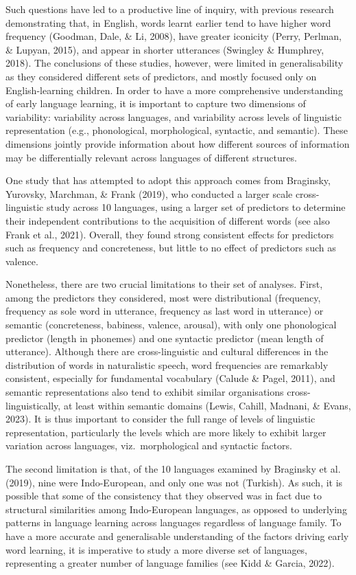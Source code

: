 \documentclass[10pt, letterpaper]{article}
\begin{document}
Such questions have led to a productive line of inquiry, with previous
research demonstrating that, in English, words learnt earlier tend to
have higher word frequency (Goodman, Dale, \& Li, 2008), have greater
iconicity (Perry, Perlman, \& Lupyan, 2015), and appear in shorter
utterances (Swingley \& Humphrey, 2018). The conclusions of these
studies, however, were limited in generalisability as they considered
different sets of predictors, and mostly focused only on
English-learning children. In order to have a more comprehensive
understanding of early language learning, it is important to capture two
dimensions of variability: variability across languages, and variability
across levels of linguistic representation (e.g., phonological,
morphological, syntactic, and semantic). These dimensions jointly
provide information about how different sources of information may be
differentially relevant across languages of different structures.

One study that has attempted to adopt this approach comes from
Braginsky, Yurovsky, Marchman, \& Frank (2019), who conducted a larger
scale cross-linguistic study across 10 languages, using a larger set of
predictors to determine their independent contributions to the
acquisition of different words (see also Frank et al., 2021). Overall,
they found strong consistent effects for predictors such as frequency
and concreteness, but little to no effect of predictors such as valence.

Nonetheless, there are two crucial limitations to their set of analyses.
First, among the predictors they considered, most were distributional
(frequency, frequency as sole word in utterance, frequency as last word
in utterance) or semantic (concreteness, babiness, valence, arousal),
with only one phonological predictor (length in phonemes) and one
syntactic predictor (mean length of utterance). Although there are
cross-linguistic and cultural differences in the distribution of words
in naturalistic speech, word frequencies are remarkably consistent,
especially for fundamental vocabulary (Calude \& Pagel, 2011), and
semantic representations also tend to exhibit similar organisations
cross-linguistically, at least within semantic domains (Lewis, Cahill,
Madnani, \& Evans, 2023). It is thus important to consider the full
range of levels of linguistic representation, particularly the levels
which are more likely to exhibit larger variation across languages,
viz.~morphological and syntactic factors.

The second limitation is that, of the 10 languages examined by Braginsky
et al. (2019), nine were Indo-European, and only one was not (Turkish).
As such, it is possible that some of the consistency that they observed
was in fact due to structural similarities among Indo-European
languages, as opposed to underlying patterns in language learning across
languages regardless of language family. To have a more accurate and
generalisable understanding of the factors driving early word learning,
it is imperative to study a more diverse set of languages, representing
a greater number of language families (see Kidd \& Garcia, 2022).
\end{document}
